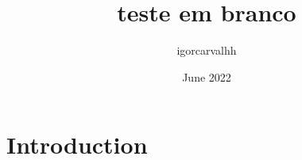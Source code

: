 \documentclass{article}
\title{teste em branco}
\author{igorcarvalhh }
\date{June 2022}
\begin{document}
\maketitle

\section{Introduction}
\end{document}
